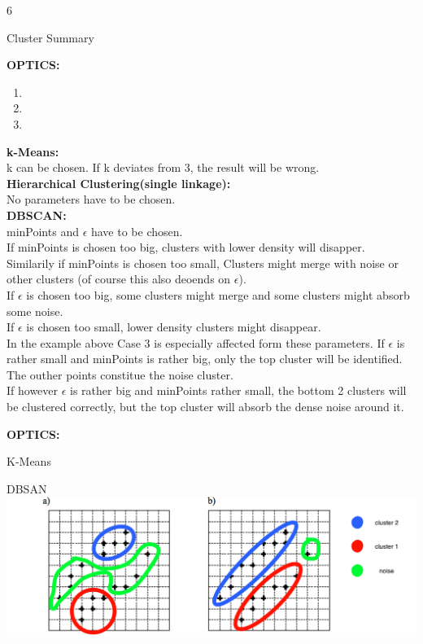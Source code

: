 \documentclass{article}
\begin{document}
\begin{ukon-infie}[5.12.17]{6}
\begin{exercise}[p=7]{Cluster Summary}
{      	\textbf{OPTICS:}
      	\begin{enumerate}
      	\item 
      	\item
      	\item
      	\end{enumerate}
       }
              
       \question{}
       {
       \textbf{k-Means:}\\
       k can be chosen. If k deviates from 3, the result will be wrong.\\
       
       \textbf{Hierarchical Clustering(single linkage):}\\
       No parameters have to be chosen.\\
       
       
       \textbf{DBSCAN:}\\
		minPoints and $\epsilon$ have to be chosen.\\
		If minPoints is chosen too big, clusters with lower density will disapper.\\
		Similarily if minPoints is chosen too small, Clusters might merge with noise or other clusters (of course this also deoends on $\epsilon$).\\
		If $\epsilon$ is chosen too big, some clusters might merge and some clusters might absorb some noise.\\
		If $\epsilon$ is chosen too small, lower density clusters might disappear.\\
		In the example above Case 3 is especially affected form these parameters. If $\epsilon$ is rather small and minPoints is rather big, only the top cluster will be identified. The outher points constitue the noise cluster.\\
		If however $\epsilon$ is rather big and minPoints rather small, the bottom 2 clusters will be clustered correctly, but the top cluster will absorb the dense noise around it.
		
       
       \textbf{OPTICS:}\\
       }
       

		\end{exercise}
		
		\begin{exercise}[p=10]{K-Means}
		
		\end{exercise}
		
		


		\begin{exercise}[p=6]{DBSAN}
		{
		\includegraphics[scale=0.4]{dbscan.png}
		}
	

\end{exercise}
\end{ukon-infie}
\end{document}
